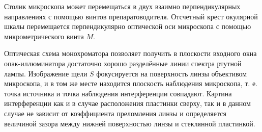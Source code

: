 \documentclass[a4paper,12pt]{article}
\begin{document}
Столик микроскопа может перемещаться в двух взаимно перпендикулярных направлениях с помощью винтов препаратоводителя. Отсчетный крест окулярной шкалы перемещается перпендикулярно оптической оси микроскопа с помощью микрометрического винта $M$. 

Оптическая схема монохроматора позволяет получить в плоскости входного окна опак-иллюминатора достаточно хорошо разделённые линии спектра ртутной лампы. Изображение щели $S$ фокусируется на поверхность линзы объективом микроскопа, и в том же месте находится плоскость наблюдения микроскопа, т. е. точка источника и точка наблюдения интерференции совпадают. Картина интерференции как и в случае расположения пластинки сверху, так и в данном случае не зависит от коэффициента преломления линзы и определяется величиной зазора между нижней поверхностью линзы  и стеклянной пластинкой.
\end{document}
